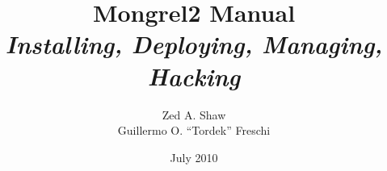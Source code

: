


\title{
    Mongrel2 Manual\\
    \textit{Installing, Deploying, Managing, Hacking}
}
\author{Zed A. Shaw \\ \small{Guillermo O. ``Tordek'' Freschi}}
\date{July 2010}



\frontmatter

\maketitle

\tableofcontents



\mainmatter








\appendix



